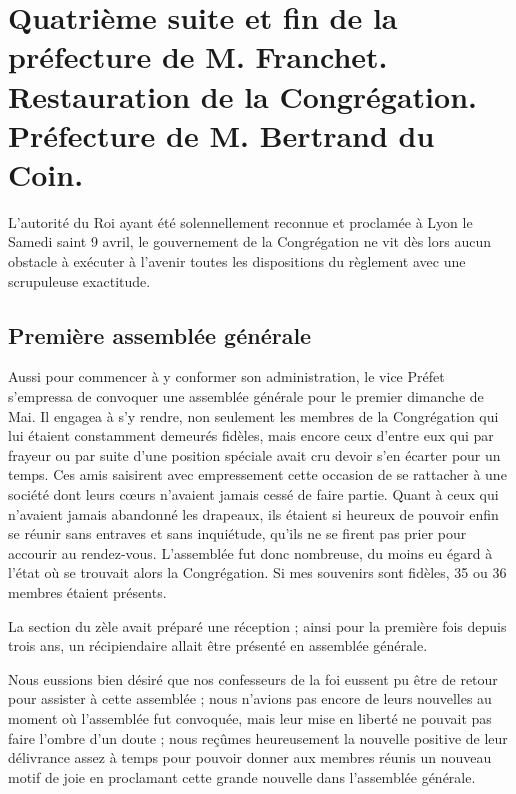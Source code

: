 \chapter{Quatrième suite et fin de la préfecture de M. Franchet. Restauration de la Congrégation. Préfecture de M. Bertrand du Coin.}

L'autorité du Roi ayant été solennellement reconnue et
proclamée à Lyon le Samedi saint 9 avril, le gouvernement de la Congrégation ne vit dès lors aucun obstacle à exécuter à l'avenir toutes les dispositions du règlement avec une scrupuleuse exactitude.

\section*{Première assemblée générale}
Aussi pour commencer à y conformer son administration, le vice Préfet s'empressa de convoquer une assemblée générale pour le premier dimanche de Mai. Il engagea à s'y rendre, non seulement les membres de la Congrégation qui lui étaient constamment demeurés fidèles, mais encore ceux d'entre eux qui par frayeur ou par suite d'une position spéciale avait cru devoir s'en écarter pour un temps. Ces amis saisirent avec empressement cette occasion de se rattacher à une société dont leurs cœurs n'avaient jamais cessé de faire partie. Quant à ceux qui n'avaient jamais abandonné les drapeaux, ils étaient si heureux de pouvoir enfin se réunir sans entraves et sans inquiétude, qu'ils ne se firent pas prier pour accourir au rendez-vous. L'assemblée fut donc nombreuse, du moins eu égard à l'état où se trouvait alors la Congrégation. Si mes souvenirs sont fidèles, 35 ou 36 membres étaient présents.

La section du zèle avait préparé une réception ; ainsi pour la première fois depuis trois ans, un récipiendaire allait être présenté en assemblée générale.

Nous eussions bien désiré que nos confesseurs de la foi eussent pu être de retour pour assister à cette assemblée ; nous n'avions pas encore de leurs nouvelles au moment où l'assemblée fut convoquée, mais leur mise en liberté ne pouvait pas faire l'ombre d'un doute ; nous reçûmes heureusement la nouvelle positive de leur délivrance assez à temps pour pouvoir donner aux membres réunis un nouveau motif de joie en proclamant cette
grande nouvelle dans l'assemblée générale.


